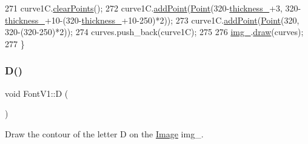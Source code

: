 \begin{DoxyCode}
271     curve1C.\mbox{\hyperlink{class_bezier_curve_a0ba8ce66d5af5971ae6a1b506029728e}{clearPoints}}();
272     curve1C.\mbox{\hyperlink{class_bezier_curve_a38d16c18b36ae45619b05e26e226cf34}{addPoint}}(\mbox{\hyperlink{class_point}{Point}}(320-\mbox{\hyperlink{class_font_v1_aed8040e76be9a52833627b92f0fb4e5f}{thickness\_}}+3, 320-
      \mbox{\hyperlink{class_font_v1_aed8040e76be9a52833627b92f0fb4e5f}{thickness\_}}+10-(320-\mbox{\hyperlink{class_font_v1_aed8040e76be9a52833627b92f0fb4e5f}{thickness\_}}+10-250)*2));
273     curve1C.\mbox{\hyperlink{class_bezier_curve_a38d16c18b36ae45619b05e26e226cf34}{addPoint}}(\mbox{\hyperlink{class_point}{Point}}(320, 320-(320-250)*2));
274     curves.push\_back(curve1C);
275 
276     \mbox{\hyperlink{class_font_v1_a00569e3e3c4b70f437b63f396f735fb0}{img\_}}.\mbox{\hyperlink{class_image_a8d162f3cab956131d58708c09aa560b0}{draw}}(curves);
277 \}
\end{DoxyCode}
\mbox{\label{class_font_v1_a3f4558aabfef6e0783c2294aecf215d0}} 
\subsubsection{\texorpdfstring{D()}{D()}}
{\footnotesize\ttfamily void Font\+V1\+::D (\begin{DoxyParamCaption}{ }\end{DoxyParamCaption})}



Draw the contour of the letter D on the \mbox{\hyperlink{class_image}{Image}} img\+\_\+. 


